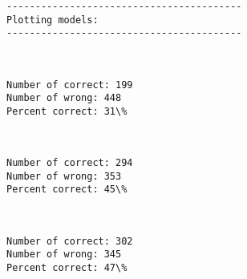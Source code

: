 \documentclass[11pt]{article}
\begin{document}
    \begin{Verbatim}[commandchars=\\\{\}]
-----------------------------------------
Plotting models:
-----------------------------------------

    \end{Verbatim}

    \begin{center}
    \end{center}
    { \hspace*{\fill} \\}
    
    \begin{Verbatim}[commandchars=\\\{\}]
Number of correct: 199
Number of wrong: 448
Percent correct: 31\%

    \end{Verbatim}

    \begin{center}
    \end{center}
    { \hspace*{\fill} \\}
    
    \begin{Verbatim}[commandchars=\\\{\}]
Number of correct: 294
Number of wrong: 353
Percent correct: 45\%

    \end{Verbatim}

    \begin{center}
    \end{center}
    { \hspace*{\fill} \\}
    
    \begin{Verbatim}[commandchars=\\\{\}]
Number of correct: 302
Number of wrong: 345
Percent correct: 47\%

    \end{Verbatim}

    \begin{center}
    \end{center}
    { \hspace*{\fill} \\}
    
\end{document}
